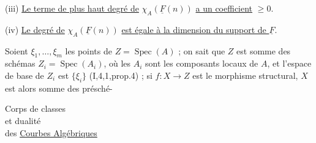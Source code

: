 (iii) \uline{Le terme de plus haut degré de} $\chi_A(\underline F(n))$ \uline{a un coefficient} $\geq0$.
\margin{$>$}

(iv) \uline{Le degré de} $\chi_A(\underline F(n))$ \uline{est égale à la dimension du support de $\underline F$}.

Soient  $\xi_1,\ldots,\xi_m$ les points de $Z=\operatorname{Spec}(A)$ ; on sait que  $Z$ est somme des schémas $Z_i=\operatorname{Spec}(A_i)$,  où  les $A_i$ sont les composants locaux de $A$, et l'espace de base de $Z_i$ est $\{\xi_i\}$ (I,4,1,prop.4) ; si $f:X\to Z$ est le morphisme structural, $X$ est alors somme des présché-

\begin{flushright}
Corps de classes\\
et dualité\\
des \uline{Courbes Algébriques}
\end{flushright}

